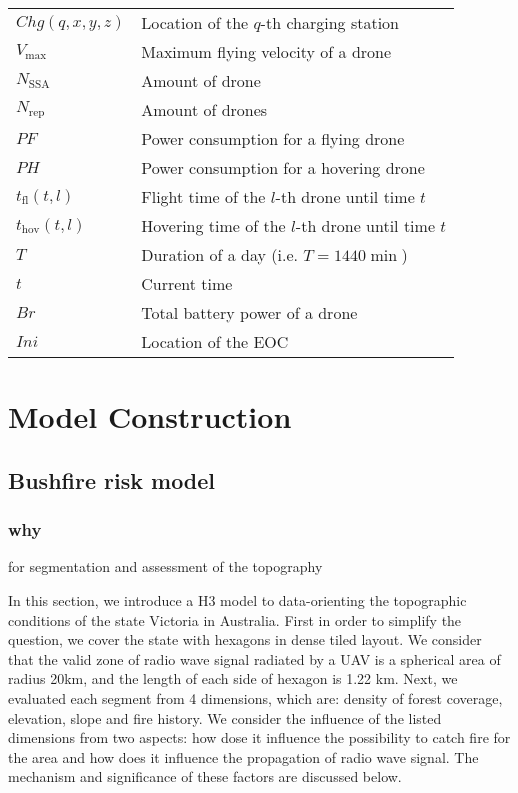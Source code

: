 \documentclass[13pt]{ctexart} %
\begin{document}
\begin{table}[h]
\begin{tabular}{>{\centering\arraybackslash}p{6em}>{\centering\arraybackslash}p{30em}}
        $Chg
        (q,x,y,z)$       & Location of the $q$-th charging station \\
        $V_{\text{max}}$ & Maximum flying velocity of a drone      \\
        $N_{\text{SSA}}$ & Amount of drone
        \uppercase\expandafter{\romannumeral1}                     \\
        $N_{\text{rep}}$ & Amount of drones
        \uppercase\expandafter{\romannumeral2}                     \\
        $PF$             & Power consumption for a flying drone    \\
        $PH$             & Power consumption for a hovering drone  \\
        $t_{\text{fl}}
        (t,l)$           & Flight time of the $l$-th drone
        until time $t$                                             \\
        $t_{\text{hov}}
        (t,l)$           & Hovering time of the $l$-th drone
        until time $t$                                             \\
        $T$              & Duration of a day (i.e. $T=1440 \min$)  \\
        $t$              & Current time                            \\
        $Br$             & Total battery power of a drone          \\
        $Ini$            & Location of the EOC                     \\
        \bottomrule
    \end{tabular}
\end{table}
\section{Model Construction}
\subsection{Bushfire risk model}
\subsubsection{why}
for segmentation and assessment of the topography

In this section, we introduce a H3 model to data-orienting the topographic conditions of the state Victoria in Australia. First in order to simplify the question, we cover the state with hexagons in dense tiled layout. We consider that the valid zone of radio wave signal radiated by a UAV is a spherical area of radius 20km, and the length of each side of hexagon is 1.22 km. Next, we evaluated each segment from 4 dimensions, which are: density of forest coverage, elevation, slope and fire history. We consider the influence of the listed dimensions from two aspects: how dose it influence the possibility to catch fire for the area and how does it influence the propagation of radio wave signal. The mechanism and significance of these factors are discussed below.
\end{document}
